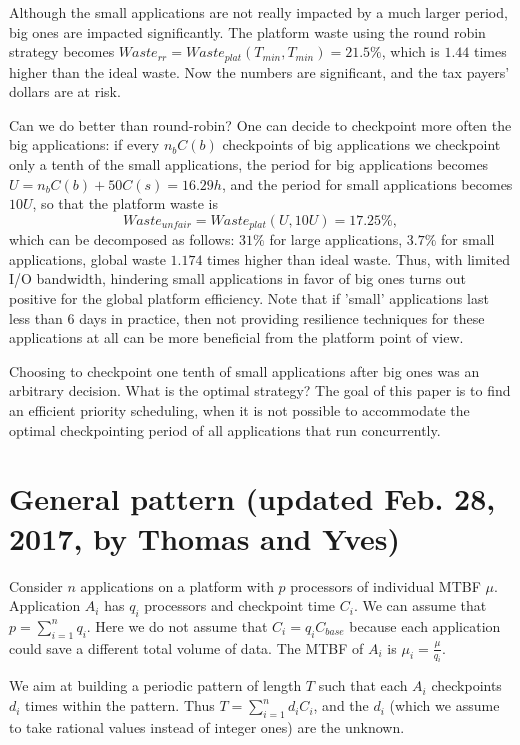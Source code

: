 \documentclass{article}
\newcommand{\ema}[1]{\ensuremath{#1}}
\newcommand{\Waste}{\ema{\mathit{Waste}\xspace}}
\begin{document}
Although the small applications are not really impacted by a much larger period, big ones are impacted significantly. The platform waste using the round robin strategy becomes
$Waste_{rr} = Waste_{plat}(T_{min}, T_{min}) = 21.5\%$, which is $1.44$ times higher than the ideal waste. Now the numbers are significant, and the tax payers' dollars are at risk.

Can we do better than round-robin?
One can decide to checkpoint more often the big applications: if every $n_bC(b)$ checkpoints of big applications we checkpoint only a tenth of the small applications, the period for big applications becomes $U = n_bC(b)+50C(s) = 16.29h$, and the period for small applications becomes $10U$, so that the platform waste is
$$\Waste_{unfair} = \Waste_{plat}(U, 10U) = 17.25\%,$$
which can be decomposed as follows: $31\%$ for large applications, $3.7\%$ for small applications, global waste $1.174$ times higher than ideal waste. Thus, with limited I/O bandwidth, hindering small applications  in favor of big ones turns out positive for the global platform efficiency. Note that if 'small' applications last less than 6 days in practice, then not providing resilience techniques for these applications at all can be more beneficial from the platform point of view.

Choosing to checkpoint one tenth of small applications after big ones was an arbitrary decision. What is the optimal strategy?
The goal of this paper is to find an efficient priority scheduling, when it is not possible to accommodate the optimal checkpointing period of all applications that run concurrently.


\section{General pattern (updated Feb. 28, 2017, by Thomas and Yves)}

Consider $n$ applications on a platform with $p$ processors of individual MTBF $\mu$.
 Application $A_{i}$ has $q_{i}$ processors and checkpoint time $C_{i}$. We can
 assume that $p = \sum_{i=1}^{n} q_{i}$.
Here we do not assume that $C_{i} = q_{i} C_{\textit{base}}$ because each application could save a different total volume of data. The MTBF of $A_{i}$ is $\mu_{i} = \frac{\mu}{q_{i}}$.

We aim at building a periodic pattern of length $T$ such that each $A_{i}$ checkpoints $d_{i}$ times
within the pattern. Thus $T  = \sum_{i=1}^{n} d_{i} C_{i}$, and the $d_{i}$ (which we assume
to take rational values instead of integer ones) are the unknown. 
\end{document}
